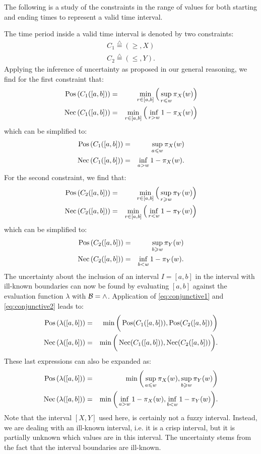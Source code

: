 The following is a study of the constraints in the range of values for both starting and ending times to represent a valid time interval.

The time period inside a valid time interval is denoted by two constraints:
\begin{eqnarray}
C_1\stackrel{\triangle}{=}\left(\geq,X\right)\\
C_2\stackrel{\triangle}{=}\left(\leq,Y\right).
\end{eqnarray}
Applying the inference of uncertainty as proposed in our general reasoning, we find for the first constraint that:
\begin{eqnarray}
\operatorname{Pos}\left(C_1([a,b])\right) &=& \min_{r\in[a,b]}\Big(\sup_{r\leqslant w}\pi_{X}(w)\Big)\\
\operatorname{Nec}\left(C_1([a,b])\right) &=& \min_{r\in[a,b]}\Big(\inf_{r>w}1-\pi_{X}(w)\Big)
\end{eqnarray}
which can be simplified to:
\begin{eqnarray}
\operatorname{Pos}\left(C_1([a,b])\right) &=& \sup_{a\leqslant w}\pi_{X}(w)\\
\operatorname{Nec}\left(C_1([a,b])\right) &=& \inf_{a>w}1-\pi_{X}(w).
\end{eqnarray}
For the second constraint, we find that:
\begin{eqnarray}
\operatorname{Pos}\left(C_2([a,b])\right) &=& \min_{r\in[a,b]}\Big(\sup_{r\geqslant w}\pi_{Y}(w)\Big)\\
\operatorname{Nec}\left(C_2([a,b])\right) &=& \min_{r\in[a,b]}\Big(\inf_{r<w}1-\pi_{Y}(w)\Big)
\end{eqnarray}
which can be simplified to:
\begin{eqnarray}
\operatorname{Pos}\left(C_2([a,b])\right) &=& \sup_{b\geqslant w}\pi_{Y}(w)\\
\operatorname{Nec}\left(C_2([a,b])\right) &=& \inf_{b<w}1-\pi_{Y}(w).
\end{eqnarray}
The uncertainty about the inclusion of an interval $I=[a,b]$ in the interval with ill-known boundaries can now be found by evaluating $[a,b]$ against the evaluation function $\lambda$ with $\operatorname*{\mathcal{B}}=\wedge$. Application of \eqref{eq:conjunctive1} and \eqref{eq:conjunctive2} leads to:
\begin{eqnarray}
\operatorname{Pos}\left(\lambda([a,b])\right)&=&\min\bigg(\operatorname{Pos}(C_1([a,b])),\operatorname{Pos}(C_2([a,b]))\bigg)\\
\operatorname{Nec}\left(\lambda([a,b])\right)&=&\min\bigg(\operatorname{Nec}(C_1([a,b])),\operatorname{Nec}(C_2([a,b]))\bigg).
\end{eqnarray}
These last expressions can also be expanded as:
\begin{eqnarray}
\label{eq:interval-pos}
\operatorname{Pos}\left(\lambda([a,b])\right)&=&\min\bigg(\sup_{a\leqslant w}\pi_{X}(w),\sup_{b\geqslant w}\pi_{Y}(w)\bigg)\\
\label{eq:interval-nec}
\operatorname{Nec}\left(\lambda([a,b])\right)&=&\min\bigg(\inf_{a>w}1-\pi_{X}(w),\inf_{b<w}1-\pi_{Y}(w)\bigg).
\end{eqnarray}
Note that the interval $[X,Y]$ used here, is certainly not a fuzzy interval. Instead, we are dealing with an ill-known interval, i.e. it is a crisp interval, but it is partially unknown which values are in this interval. The uncertainty stems from the fact that the interval boundaries are ill-known.

